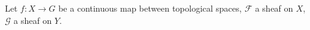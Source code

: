 Let $f\colon X\to G$ be a continuous map between topological spaces, $\mathcal{F}$ a sheaf on
$X$, $\mathcal{G}$ a sheaf on $Y$.
